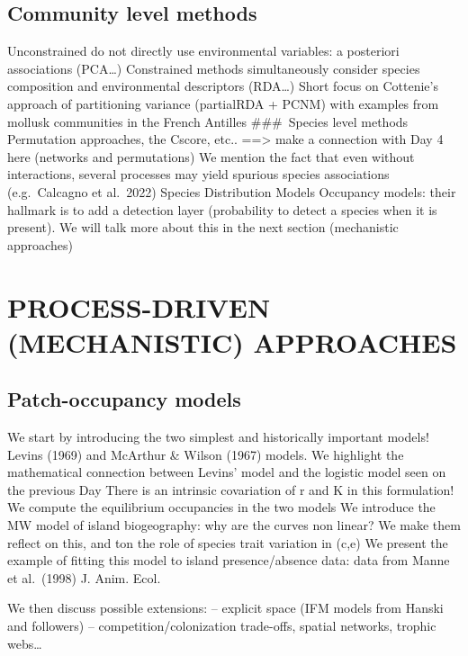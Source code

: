 \documentclass[
]{book}
\theoremstyle{definition}
\theoremstyle{definition}
\theoremstyle{definition}
\theoremstyle{definition}
\theoremstyle{remark}
\begin{document}
\subsection{Community level methods}\label{community-level-methods}

Unconstrained do not directly use environmental variables: a posteriori associations (PCA\ldots)
Constrained methods simultaneously consider species composition and environmental descriptors (RDA\ldots)
Short focus on Cottenie's approach of partitioning variance (partialRDA + PCNM) with examples from mollusk communities in the French Antilles
\#\#\#~Species level methods
Permutation approaches, the Cscore, etc.. ==\textgreater{} make a connection with Day 4 here (networks and permutations)
We mention the fact that even without interactions, several processes may yield spurious species associations (e.g.~Calcagno et al.~2022)
Species Distribution Models
Occupancy models: their hallmark is to add a detection layer (probability to detect a species when it is present). We will talk more about this in the next section (mechanistic approaches)

\section{PROCESS-DRIVEN (MECHANISTIC) APPROACHES}\label{process-driven-mechanistic-approaches}

\subsection{Patch-occupancy models}\label{patch-occupancy-models}

We start by introducing the two simplest and historically important models! Levins (1969) and McArthur \& Wilson (1967) models.
We highlight the mathematical connection between Levins' model and the logistic model seen on the previous Day
There is an intrinsic covariation of r and K in this formulation!
We compute the equilibrium occupancies in the two models
We introduce the MW model of island biogeography: why are the curves non linear? We make them reflect on this, and ton the role of species trait variation in (c,e)
We present the example of fitting this model to island presence/absence data: data from Manne et al.~(1998) J. Anim. Ecol.

We then discuss possible extensions:
-- explicit space (IFM models from Hanski and followers)
-- competition/colonization trade-offs, spatial networks, trophic webs\ldots{}
\end{document}
